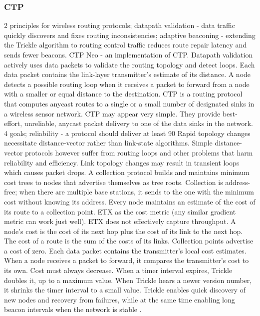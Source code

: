 \subsubsection*{CTP}
2 principles for wireless routing protocols; datapath validation - data traffic quickly discovers and fixes routing inconsistencies; adaptive beaconing - extending the Trickle algorithm to routing control traffic reduces route repair latency and sends fewer beacons. CTP Neo - an implementation of CTP.
Datapath validation actively uses data packets to validate the routing topology and detect loops. Each data packet contains the link-layer transmitter’s estimate of its distance. A node detects a possible routing loop when it receives a packet to forward from a node with a smaller or equal distance to the destination.
CTP is a routing protocol that computes anycast routes to a single or a small number of designated sinks in a wireless sensor network. CTP may appear very simple. They provide best-effort, unreliable, anycast packet delivery to one of the data sinks in the network. 
4 goals; reliability - a protocol should deliver at least 90%
Rapid topology changes necessitate distance-vector rather than link-state algorithms. Simple distance-vector protocols however suffer from routing loops and other problems that harm reliability and efficiency. Link topology changes may result in transient loops which causes packet drops. A collection protocol builds and maintains minimum cost trees to nodes that advertise themselves as tree roots. Collection is address-free; when there are multiple base stations, it sends to the one with the minimum cost without knowing its address.
Every node maintains an estimate of the cost of its route to a collection point. ETX as the cost metric (any similar gradient metric can work just well). ETX does not effectively capture throughput. A node’s cost is the cost of its next hop plus the cost of its link to the next hop. The cost of a route is the sum of the costs of its links. Collection points advertise a cost of zero. Each data packet contains the transmitter’s local cost estimates. When a node receives a packet to forward, it compares the transmitter’s cost to its own. Cost must always decrease. 
When a timer interval expires, Trickle doubles it, up to a maximum value. When Trickle hears a newer version number, it shrinks the timer interval to a small value. Trickle enables quick discovery of new nodes and recovery from failures, while at the same time enabling long beacon intervals when the network is stable \cite{ctp}. 

